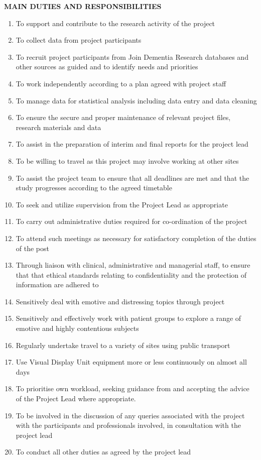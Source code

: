 \documentclass[11pt]{article}
\begin{document}
\textbf{MAIN DUTIES AND RESPONSIBILITIES}
\begin{enumerate}
	\item To support and contribute to the research activity of the project
	\item To collect data from project participants
	\item To recruit project participants from Join Dementia Research databases and other sources as guided and to identify needs and priorities
	\item To work independently according to a plan agreed with project staff
	\item To manage data for statistical analysis including data entry and data cleaning
	\item To ensure the secure and proper maintenance of relevant project files, research materials and data
	\item To assist in the preparation of interim and final reports for the project lead
	\item To be willing to travel as this project may involve working at other sites
	\item To assist the project team to ensure that all deadlines are met and that the study progresses according to the agreed timetable
	\item To seek and utilize supervision from the Project Lead as appropriate
	\item To carry out administrative duties required for co-ordination of the project
	\item To attend such meetings as necessary for satisfactory completion of the duties of the post
	\item Through liaison with clinical, administrative and managerial staff, to ensure that that ethical standards relating to confidentiality and the protection of information are adhered to
	\item Sensitively deal with emotive and distressing topics through project
	\item Sensitively and effectively work with patient groups to explore a range of emotive and highly contentious subjects
	\item Regularly undertake travel to a variety of sites using public transport
	\item Use Visual Display Unit equipment more or less continuously on almost all days
	\item To prioritise own workload, seeking guidance from and accepting the advice of the Project Lead where appropriate.  
	\item To be involved in the discussion of any queries associated with the project with the participants and professionals involved, in consultation with the project lead
	\item To conduct all other duties as agreed by the project lead 
\end{enumerate}
\end{document}
